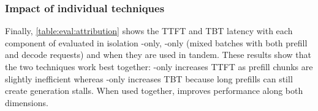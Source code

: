 \subsubsection{Impact of individual techniques}
\label{sec-eval-ablation2}
Finally, \autoref{table:eval:attribution} shows the TTFT and TBT latency with each component of  \sysname evaluated in isolation \ie \chunking-only, \dcoel-only (mixed batches with both prefill and decode requests) and when they are used in tandem. These results show that the two techniques work best together: \chunking-only increases TTFT as prefill chunks are slightly inefficient whereas \dcoel-only increases TBT because long prefills can still create generation stalls. When used together, \sysname improves performance along both dimensions.
